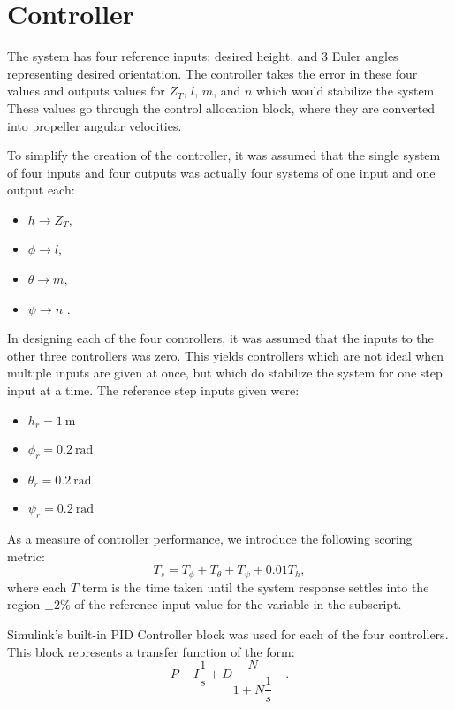 \section*{Controller}

The system has four reference inputs: desired height, and 3 Euler angles representing desired orientation. The controller takes the error in these four values and outputs values for $Z_T$, $l$, $m$, and $n$ which would stabilize the system. These values go through the control allocation block, where they are converted into propeller angular velocities.

To simplify the creation of the controller, it was assumed that the single system of four inputs and four outputs was actually four systems of one input and one output each:
\begin{itemize}
    \item $h \rightarrow Z_T$,
    \item $\phi \rightarrow l$,
    \item $\theta \rightarrow m$,
    \item $\psi \rightarrow n$ .
\end{itemize}

In designing each of the four controllers, it was assumed that the inputs to the other three controllers was zero. This yields controllers which are not ideal when multiple inputs are given at once, but which do stabilize the system for one step input at a time. The reference step inputs given were:
\begin{itemize}
    \item $h_r = 1 ~ \text{m}$
    \item $\phi_r = 0.2 ~ \text{rad}$
    \item $\theta_r = 0.2 ~ \text{rad}$
    \item $\psi_r = 0.2 ~ \text{rad}$
\end{itemize}

As a measure of controller performance, we introduce the following scoring metric:
\begin{equation}
    T_s = T_\phi + T_\theta + T_\psi + 0.01T_h,
\end{equation}
where each $T$ term is the time taken until the system response settles into the region $\pm 2\%$ of the reference input value for the variable in the subscript.

Simulink's built-in PID Controller block was used for each of the four controllers. This block represents a transfer function of the form:
\begin{equation*}
    P + I\dfrac{1}{s} + D\dfrac{N}{1 + N\dfrac{1}{s}} \quad .
\end{equation*}

